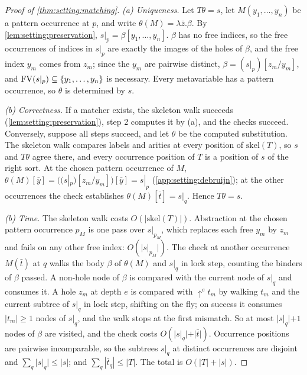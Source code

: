 \begin{proof}[Proof of \cref{thm:setting:matching}]
\emph{(a) Uniqueness.} Let $T\theta=s$, let $M(y_1,\dots,y_n)$ be a pattern occurrence at $p$, and write $\theta(M)=\lambda\bar z.\beta$. By \cref{lem:setting:preservation}, $s|_p=\beta[y_1,\dots,y_n]$. $\beta$ has no free indices, so the free occurrences of indices in $s|_p$ are exactly the images of the holes of $\beta$, and the free index $y_m$ comes from $z_m$; since the $y_m$ are pairwise distinct, $\beta=(s|_p)[z_m/y_m]$, and $\mathrm{FV}(s|_p)\subseteq\{y_1,\dots,y_n\}$ is necessary. Every metavariable has a pattern occurrence, so $\theta$ is determined by $s$.

\emph{(b) Correctness.} If a matcher exists, the skeleton walk succeeds (\cref{lem:setting:preservation}), step 2 computes it by (a), and the checks succeed. Conversely, suppose all steps succeed, and let $\theta$ be the computed substitution. The skeleton walk compares labels and arities at every position of $\mathrm{skel}(T)$, so $s$ and $T\theta$ agree there, and every occurrence position of $T$ is a position of $s$ of the right sort. At the chosen pattern occurrence of $M$, $\theta(M)[\bar y]=((s|_p)[z_m/y_m])[\bar y]=s|_p$ (\cref{app:setting:debruijn}); at the other occurrences the check establishes $\theta(M)[\bar t]=s|_q$. Hence $T\theta=s$.

\emph{(b) Time.} The skeleton walk costs $O(|\mathrm{skel}(T)|)$. Abstraction at the chosen pattern occurrence $p_M$ is one pass over $s|_{p_M}$, which replaces each free $y_m$ by $z_m$ and fails on any other free index: $O(|s|_{p_M}|)$. The check at another occurrence $M(\bar t)$ at $q$ walks the body $\beta$ of $\theta(M)$ and $s|_q$ in lock step, counting the binders of $\beta$ passed. A non-hole node of $\beta$ is compared with the current node of $s|_q$ and consumes it. A hole $z_m$ at depth $e$ is compared with $\uparrow^e t_m$ by walking $t_m$ and the current subtree of $s|_q$ in lock step, shifting on the fly; on success it consumes $|t_m|\ge1$ nodes of $s|_q$, and the walk stops at the first mismatch. So at most $|s|_q|+1$ nodes of $\beta$ are visited, and the check costs $O(|s|_q|+|\bar t|)$. Occurrence positions are pairwise incomparable, so the subtrees $s|_q$ at distinct occurrences are disjoint and $\sum_q|s|_q|\le|s|$; and $\sum_q|\bar t_q|\le|T|$. The total is $O(|T|+|s|)$.


\end{proof}
